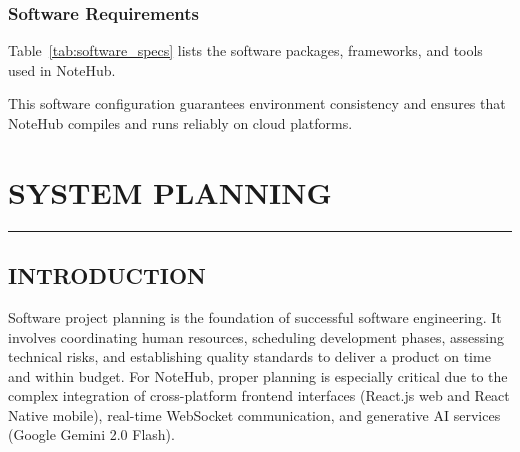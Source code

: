 \documentclass[12,Times new Roman,a4paper]{report}
\begin{document}
\subsection{Software Requirements}
Table~\ref{tab:software_specs} lists the software packages, frameworks, and tools used in NoteHub.

\begin{table}[htbp]
\centering
\caption{System Software Specifications}
\label{tab:software_specs}
\end{table}

This software configuration guarantees environment consistency and ensures that NoteHub compiles and runs reliably on cloud platforms.
\chapter{SYSTEM PLANNING}
\rule{\textwidth}{1pt}

\section{INTRODUCTION}
Software project planning is the foundation of successful software engineering. It involves coordinating human resources, scheduling development phases, assessing technical risks, and establishing quality standards to deliver a product on time and within budget. For NoteHub, proper planning is especially critical due to the complex integration of cross-platform frontend interfaces (React.js web and React Native mobile), real-time WebSocket communication, and generative AI services (Google Gemini 2.0 Flash). 
\end{document}
